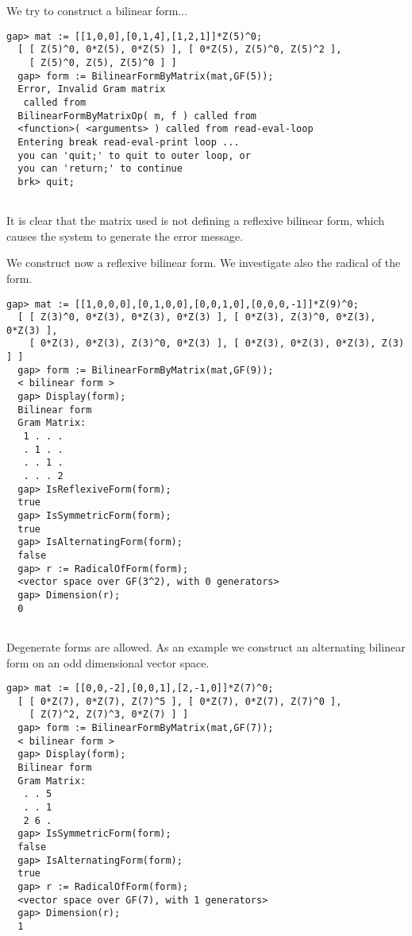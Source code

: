 \documentclass[a4paper,11pt]{report}
\begin{document}
{{{ We try to construct a bilinear form... 
\begin{Verbatim}[fontsize=\small,frame=single,label=Example]
  gap> mat := [[1,0,0],[0,1,4],[1,2,1]]*Z(5)^0;
  [ [ Z(5)^0, 0*Z(5), 0*Z(5) ], [ 0*Z(5), Z(5)^0, Z(5)^2 ], 
    [ Z(5)^0, Z(5), Z(5)^0 ] ]
  gap> form := BilinearFormByMatrix(mat,GF(5));
  Error, Invalid Gram matrix
   called from
  BilinearFormByMatrixOp( m, f ) called from
  <function>( <arguments> ) called from read-eval-loop
  Entering break read-eval-print loop ...
  you can 'quit;' to quit to outer loop, or
  you can 'return;' to continue
  brk> quit;
   
\end{Verbatim}
 It is clear that the matrix used is not defining a reflexive bilinear form,
which causes the system to generate the error message. 

 We construct now a reflexive bilinear form. We investigate also the radical of
the form. 
\begin{Verbatim}[fontsize=\small,frame=single,label=Example]
  gap> mat := [[1,0,0,0],[0,1,0,0],[0,0,1,0],[0,0,0,-1]]*Z(9)^0;
  [ [ Z(3)^0, 0*Z(3), 0*Z(3), 0*Z(3) ], [ 0*Z(3), Z(3)^0, 0*Z(3), 0*Z(3) ], 
    [ 0*Z(3), 0*Z(3), Z(3)^0, 0*Z(3) ], [ 0*Z(3), 0*Z(3), 0*Z(3), Z(3) ] ]
  gap> form := BilinearFormByMatrix(mat,GF(9));
  < bilinear form >
  gap> Display(form);
  Bilinear form
  Gram Matrix:
   1 . . .
   . 1 . .
   . . 1 .
   . . . 2
  gap> IsReflexiveForm(form);
  true
  gap> IsSymmetricForm(form);
  true
  gap> IsAlternatingForm(form);
  false
  gap> r := RadicalOfForm(form);
  <vector space over GF(3^2), with 0 generators>
  gap> Dimension(r);
  0
   
\end{Verbatim}
 

 Degenerate forms are allowed. As an example we construct an alternating
bilinear form on an odd dimensional vector space. 
\begin{Verbatim}[fontsize=\small,frame=single,label=Example]
  gap> mat := [[0,0,-2],[0,0,1],[2,-1,0]]*Z(7)^0;
  [ [ 0*Z(7), 0*Z(7), Z(7)^5 ], [ 0*Z(7), 0*Z(7), Z(7)^0 ], 
    [ Z(7)^2, Z(7)^3, 0*Z(7) ] ]
  gap> form := BilinearFormByMatrix(mat,GF(7));
  < bilinear form >
  gap> Display(form);
  Bilinear form
  Gram Matrix:
   . . 5
   . . 1
   2 6 .
  gap> IsSymmetricForm(form);
  false
  gap> IsAlternatingForm(form);
  true
  gap> r := RadicalOfForm(form);
  <vector space over GF(7), with 1 generators>
  gap> Dimension(r);
  1
   

\end{Verbatim}}}}
\end{document}

